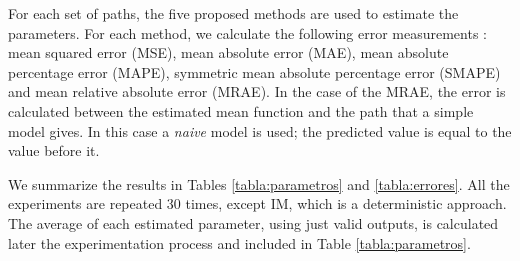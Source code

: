 \documentclass{sig-alternate}
\begin{document}
For each set of paths, the five proposed methods are used to estimate the parameters. For each method, we calculate the following error measurements \cite{error}: mean squared error (MSE), mean absolute error (MAE), mean absolute percentage error (MAPE), symmetric mean absolute percentage error (SMAPE) and mean relative absolute error (MRAE). In the case of the MRAE, the error is calculated between the estimated mean function and the path that a simple model gives. In this case a \emph{naive} model is used; the predicted value is equal to the value before it.

We summarize the results in Tables \ref{tabla:parametros}  and \ref{tabla:errores}. All the experiments are repeated 30 times, except IM, which is a deterministic approach. The average of each estimated parameter, using just valid outputs, is calculated later the experimentation process and included in Table \ref{tabla:parametros}.


\end{document}
